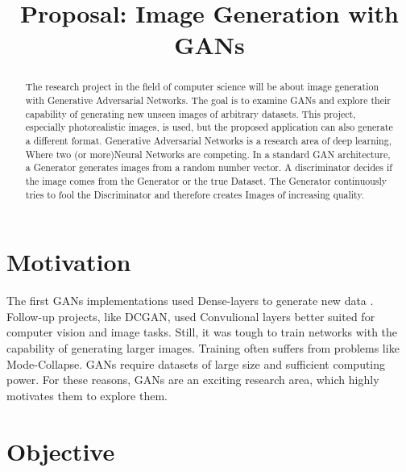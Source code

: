 \documentclass[conference,onecolumn,compsoc]{IEEEtran}
\begin{document}
\title{Proposal: Image Generation with GANs}

\author{
}
\maketitle

\begin{abstract}

\noindent
The research project in the field of computer science will be about image generation with Generative Adversarial Networks. The goal is to examine GANs and explore their capability of generating new unseen images of arbitrary datasets. This project, especially photorealistic images, is used, but the proposed application can also generate a different format. Generative Adversarial Networks is a research area of deep learning, Where two (or more)Neural Networks are competing. In a standard GAN architecture, a Generator generates images from a random number vector. A discriminator decides if the image comes from the Generator or the true Dataset. The Generator continuously tries to fool the Discriminator and therefore creates Images of increasing quality.

\end{abstract}


\section{Motivation}

\noindent
The first GANs implementations used Dense-layers to generate new data \cite{goodfellow2014generative}. Follow-up projects, like DCGAN, \cite{radford2016unsupervised} used Convulional layers better suited for computer vision and image tasks. Still, it was tough to train networks with the capability of generating larger images. Training often suffers from problems like Mode-Collapse. GANs require datasets of large size and sufficient computing power. For these reasons, GANs are an exciting research area, which highly motivates them to explore them.


\section{Objective}
\end{document}
